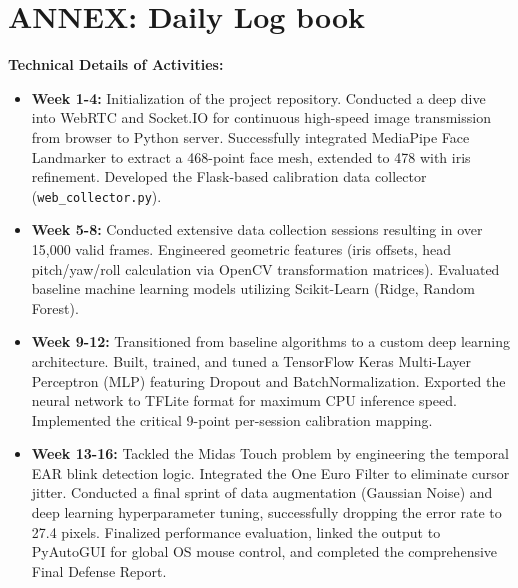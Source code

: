 \documentclass[12pt,a4paper]{report}
\begin{document}
\chapter*{ANNEX: Daily Log book}
\textbf{Technical Details of Activities:}
\begin{itemize}
    \item \textbf{Week 1-4:} Initialization of the project repository. Conducted a deep dive into WebRTC and Socket.IO for continuous high-speed image transmission from browser to Python server. Successfully integrated MediaPipe Face Landmarker to extract a 468-point face mesh, extended to 478 with iris refinement. Developed the Flask-based calibration data collector (\texttt{web\_collector.py}).
    \item \textbf{Week 5-8:} Conducted extensive data collection sessions resulting in over 15,000 valid frames. Engineered geometric features (iris offsets, head pitch/yaw/roll calculation via OpenCV transformation matrices). Evaluated baseline machine learning models utilizing Scikit-Learn (Ridge, Random Forest).
    \item \textbf{Week 9-12:} Transitioned from baseline algorithms to a custom deep learning architecture. Built, trained, and tuned a TensorFlow Keras Multi-Layer Perceptron (MLP) featuring Dropout and BatchNormalization. Exported the neural network to TFLite format for maximum CPU inference speed. Implemented the critical 9-point per-session calibration mapping.
    \item \textbf{Week 13-16:} Tackled the Midas Touch problem by engineering the temporal EAR blink detection logic. Integrated the One Euro Filter to eliminate cursor jitter. Conducted a final sprint of data augmentation (Gaussian Noise) and deep learning hyperparameter tuning, successfully dropping the error rate to 27.4 pixels. Finalized performance evaluation, linked the output to PyAutoGUI for global OS mouse control, and completed the comprehensive Final Defense Report.
\end{itemize}
\end{document}
